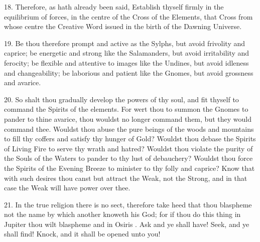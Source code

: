 18. Therefore, as hath already been said, Establish thyself firmly in the equilibrium of forces, in the centre of the Cross of the Elements, that Cross from whose centre the Creative Word issued in the birth of the Dawning Universe.

19. Be thou therefore prompt and active as the Sylphs, but avoid frivolity and caprice; be energetic and strong like the Salamanders, but avoid irritability and ferocity; be flexible and attentive to images like the Undines, but avoid idleness and changeability; be laborious and patient like the Gnomes, but avoid grossness and avarice.

20. So shalt thou gradually develop the powers of thy soul, and fit thyself to command the Spirits of the elements. For wert thou to summon the Gnomes to pander to thine avarice, thou wouldst no longer command them, but they would command thee. Wouldst thou abuse the pure beings of the woods and mountains to fill thy coffers and satisfy thy hunger of Gold? Wouldst thou debase the Spirits of Living Fire to serve thy wrath and hatred? Wouldst thou violate the purity of the Souls of the Waters to pander to thy lust of debauchery? Wouldst thou force the Spirits of the Evening Breeze to minister to thy folly and caprice? Know that with such desires thou canst but attract the Weak, not the Strong, and in that case the Weak will have power over thee.

21. In the true religion there is no sect, therefore take heed that thou blaspheme not the name by which another knoweth his God; for if thou do this thing in Jupiter thou wilt blaspheme  and in Osiris . Ask and ye shall have! Seek, and ye shall find! Knock, and it shall be opened unto you!

